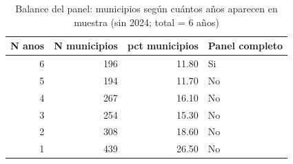 \begin{table}[ht]
\centering
\caption{Balance del panel: municipios seg\'un cu\'antos a\~{n}os aparecen en muestra (sin 2024; total = 6 a\~{n}os)} 
\label{tab:14b_balance_panel}
\begin{tabular}{rrrl}
  \toprule
N anos & N municipios & pct municipios & Panel completo \\ 
  \midrule
  6 & 196 & 11.80 & Si \\ 
    5 & 194 & 11.70 & No \\ 
    4 & 267 & 16.10 & No \\ 
    3 & 254 & 15.30 & No \\ 
    2 & 308 & 18.60 & No \\ 
    1 & 439 & 26.50 & No \\ 
   \bottomrule
\end{tabular}
\end{table}
